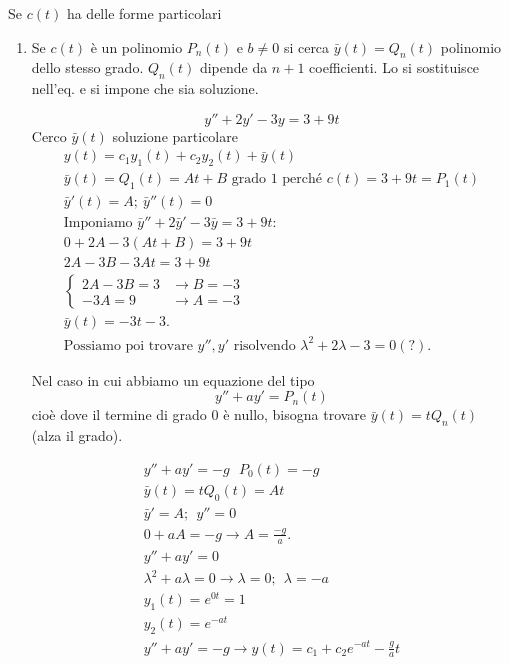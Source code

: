 Se $c(t)$ ha delle forme particolari
\begin{enumerate}
    \item Se $c(t)$ è un polinomio $P_n(t)$ e $b\not=0$ si cerca $\bar{y}(t) = Q_n(t)$ polinomio dello stesso grado. $Q_n(t)$ dipende da $n+1$ coefficienti. Lo si sostituisce nell'eq. e si impone che sia soluzione.
    \begin{esempio}
        \begin{equation}
            y''+2y'-3y=3+9t
        \end{equation}
        Cerco $\bar{y}(t)$ soluzione particolare
        \begin{gather*}
            y(t) = c_1y_1(t)+c_2y_2(t)+\bar{y}(t) \\
            \bar{y}(t) = Q_1(t) = At+B \text{ grado 1 perché }c(t) = 3+9t = P_1(t) \\
            \bar{y}'(t) = A;\ \bar{y}''(t) = 0 \\
            \text{Imponiamo } \bar{y}''+ 2 \bar{y}' - 3 \bar{y}= 3 + 9t: \\
            0+2A-3(At+B) = 3+9t \\
            2A -3B-3At=3+9t \\
            \begin{cases}
                2A-3B=3 & \to B=-3\\
                -3A=9 & \to A=-3
            \end{cases} \\
            \bar{y}(t) = -3t-3. \\
            \text{Possiamo poi trovare $y'', y'$ risolvendo }\lambda^2 + 2\lambda-3=0 (?).
        \end{gather*}
    \end{esempio}

    Nel caso in cui abbiamo un equazione del tipo
    \begin{equation}
        y''+ay'=P_n(t)
    \end{equation}
    cioè dove il termine di grado 0 è nullo, bisogna trovare $\bar{y}(t)=tQ_n(t)$ (alza il grado).
    \begin{esempio}
        \begin{gather*}
            y''+ay'=-g\ \ \ P_0(t)=-g \\
            \bar{y}(t) = tQ_0(t)=At \\
            \bar{y}'=A;\ \ y''=0 \\
            0+aA=-g\to A=\frac{-g}{a}. \\
            y''+ay'=0 \\
            \lambda^2+ a \lambda = 0\to \lambda = 0;\ \ \lambda=-a\\
            y_1(t)=e^{0t}=1 \\
            y_2(t)=e^{-at} \\
            y''+ay'=-g \longrightarrow y(t)=c_1+c_2e^{-at}- \frac{g}{a}t
        \end{gather*}
    \end{esempio}


\end{enumerate}
